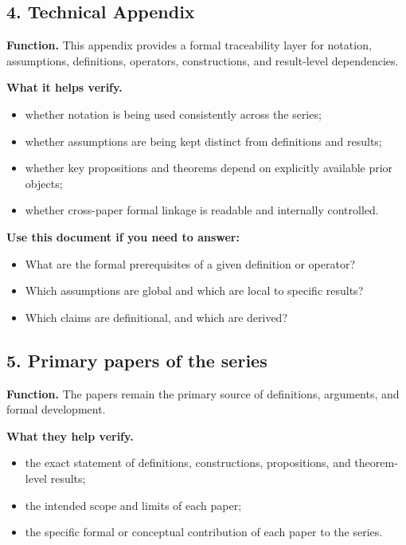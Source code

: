 \documentclass[11pt,a4paper]{article}
\begin{document}
\subsection{4. Technical Appendix}

\textbf{Function.}  
This appendix provides a formal traceability layer for notation, assumptions, definitions,
operators, constructions, and result-level dependencies.

\textbf{What it helps verify.}
\begin{itemize}[leftmargin=2em]
	\item whether notation is being used consistently across the series;
	\item whether assumptions are being kept distinct from definitions and results;
	\item whether key propositions and theorems depend on explicitly available prior objects;
	\item whether cross-paper formal linkage is readable and internally controlled.
\end{itemize}

\textbf{Use this document if you need to answer:}
\begin{itemize}[leftmargin=2em]
	\item What are the formal prerequisites of a given definition or operator?
	\item Which assumptions are global and which are local to specific results?
	\item Which claims are definitional, and which are derived?
\end{itemize}

\subsection{5. Primary papers of the series}

\textbf{Function.}  
The papers remain the primary source of definitions, arguments, and formal development.

\textbf{What they help verify.}
\begin{itemize}[leftmargin=2em]
	\item the exact statement of definitions, constructions, propositions, and theorem-level results;
	\item the intended scope and limits of each paper;
	\item the specific formal or conceptual contribution of each paper to the series.
\end{itemize}
\end{document}
